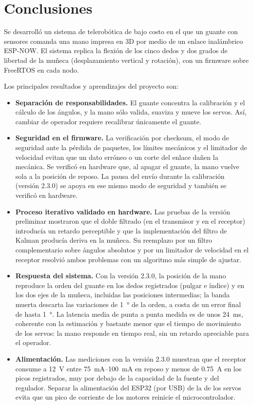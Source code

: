 \section{Conclusiones}
\label{sec:conclusiones}

Se desarrolló un sistema de telerobótica de bajo costo en el que un guante con sensores comanda una mano impresa en 3D por medio de un enlace inalámbrico ESP-NOW. El sistema replica la flexión de los cinco dedos y dos grados de libertad de la muñeca (desplazamiento vertical y rotación), con un firmware sobre FreeRTOS en cada nodo.

Los principales resultados y aprendizajes del proyecto son:

\begin{itemize}
    \item \textbf{Separación de responsabilidades.} El guante concentra la calibración y el cálculo de los ángulos, y la mano sólo valida, suaviza y mueve los servos. Así, cambiar de operador requiere recalibrar únicamente el guante.
    \item \textbf{Seguridad en el firmware.} La verificación por checksum, el modo de seguridad ante la pérdida de paquetes, los límites mecánicos y el limitador de velocidad evitan que un dato erróneo o un corte del enlace dañen la mecánica. Se verificó en hardware que, al apagar el guante, la mano vuelve sola a la posición de reposo. La pausa del envío durante la calibración (versión 2.3.0) se apoya en ese mismo modo de seguridad y también se verificó en hardware.
    \item \textbf{Proceso iterativo validado en hardware.} Las pruebas de la versión preliminar mostraron que el doble filtrado (en el transmisor y en el receptor) introducía un retardo perceptible y que la implementación del filtro de Kalman producía deriva en la muñeca. Su reemplazo por un filtro complementario sobre ángulos absolutos y por un limitador de velocidad en el receptor resolvió ambos problemas con un algoritmo más simple de ajustar.
    \item \textbf{Respuesta del sistema.} Con la versión 2.3.0, la posición de la mano reproduce la orden del guante en los dedos registrados (pulgar e índice) y en los dos ejes de la muñeca, incluidas las posiciones intermedias; la banda muerta descarta las variaciones de \SI{1}{\degree} de la orden, a costa de un error final de hasta \SI{1}{\degree}. La latencia media de punta a punta medida es de unos \SI{24}{\milli\second}, coherente con la estimación y bastante menor que el tiempo de movimiento de los servos: la mano responde en tiempo real, sin un retardo apreciable para el operador.
    \item \textbf{Alimentación.} Las mediciones con la versión 2.3.0 muestran que el receptor consume a \SI{12}{\volt} entre \SIrange{75}{100}{\milli\ampere} en reposo y menos de \SI{0.75}{\ampere} en los picos registrados, muy por debajo de la capacidad de la fuente y del regulador. Separar la alimentación del ESP32 (por USB) de la de los servos evita que un pico de corriente de los motores reinicie el microcontrolador.
\end{itemize}

